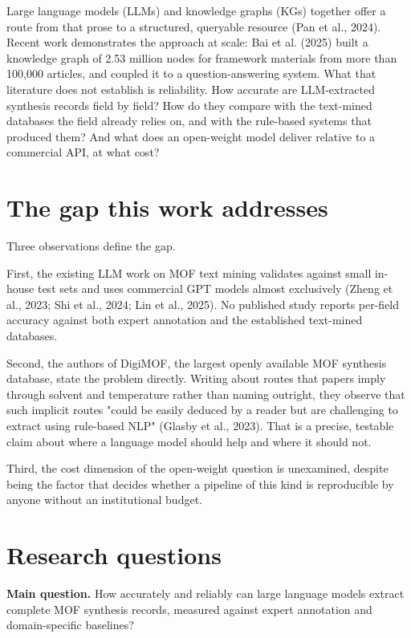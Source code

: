 \documentclass[11pt,a4paper,oneside]{report}
\begin{document}
Large language models (LLMs) and knowledge graphs (KGs) together offer a route from that prose to a structured, queryable resource (Pan et al., 2024). Recent work demonstrates the approach at scale: Bai et al. (2025) built a knowledge graph of 2.53 million nodes for framework materials from more than 100,000 articles, and coupled it to a question-answering system. What that literature does not establish is reliability. How accurate are LLM-extracted synthesis records field by field? How do they compare with the text-mined databases the field already relies on, and with the rule-based systems that produced them? And what does an open-weight model deliver relative to a commercial API, at what cost?

\section{The gap this work addresses}

Three observations define the gap.

First, the existing LLM work on MOF text mining validates against small in-house test sets and uses commercial GPT models almost exclusively (Zheng et al., 2023; Shi et al., 2024; Lin et al., 2025). No published study reports per-field accuracy against both expert annotation and the established text-mined databases.

Second, the authors of DigiMOF, the largest openly available MOF synthesis database, state the problem directly. Writing about routes that papers imply through solvent and temperature rather than naming outright, they observe that such implicit routes "could be easily deduced by a reader but are challenging to extract using rule-based NLP" (Glasby et al., 2023). That is a precise, testable claim about where a language model should help and where it should not.

Third, the cost dimension of the open-weight question is unexamined, despite being the factor that decides whether a pipeline of this kind is reproducible by anyone without an institutional budget.

\section{Research questions}

\textbf{Main question.} How accurately and reliably can large language models extract complete MOF synthesis records, measured against expert annotation and domain-specific baselines?
\end{document}
